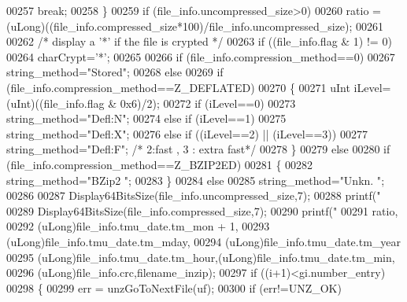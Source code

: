 \begin{DoxyCode}
{{{{{00257             \textcolor{keywordflow}{break};
00258         \}
00259         \textcolor{keywordflow}{if} (file\_info.uncompressed\_size>0)
00260             ratio = (uLong)((file\_info.compressed\_size*100)/file\_info.uncompressed\_size);
00261 
00262         \textcolor{comment}{/* display a '*' if the file is crypted */}
00263         \textcolor{keywordflow}{if} ((file\_info.flag & 1) != 0)
00264             charCrypt=\textcolor{charliteral}{'*'};
00265 
00266         \textcolor{keywordflow}{if} (file\_info.compression\_method==0)
00267             string\_method=\textcolor{stringliteral}{"Stored"};
00268         \textcolor{keywordflow}{else}
00269         \textcolor{keywordflow}{if} (file\_info.compression\_method==Z\_DEFLATED)
00270         \{
00271             uInt iLevel=(uInt)((file\_info.flag & 0x6)/2);
00272             \textcolor{keywordflow}{if} (iLevel==0)
00273               string\_method=\textcolor{stringliteral}{"Defl:N"};
00274             \textcolor{keywordflow}{else} \textcolor{keywordflow}{if} (iLevel==1)
00275               string\_method=\textcolor{stringliteral}{"Defl:X"};
00276             \textcolor{keywordflow}{else} \textcolor{keywordflow}{if} ((iLevel==2) || (iLevel==3))
00277               string\_method=\textcolor{stringliteral}{"Defl:F"}; \textcolor{comment}{/* 2:fast , 3 : extra fast*/}
00278         \}
00279         \textcolor{keywordflow}{else}
00280         \textcolor{keywordflow}{if} (file\_info.compression\_method==Z\_BZIP2ED)
00281         \{
00282               string\_method=\textcolor{stringliteral}{"BZip2 "};
00283         \}
00284         \textcolor{keywordflow}{else}
00285             string\_method=\textcolor{stringliteral}{"Unkn. "};
00286 
00287         Display64BitsSize(file\_info.uncompressed\_size,7);
00288         printf(\textcolor{stringliteral}{"  %
00289         Display64BitsSize(file\_info.compressed\_size,7);
00290         printf(\textcolor{stringliteral}{" %
00291                 ratio,
00292                 (uLong)file\_info.tmu\_date.tm\_mon + 1,
00293                 (uLong)file\_info.tmu\_date.tm\_mday,
00294                 (uLong)file\_info.tmu\_date.tm\_year %
00295                 (uLong)file\_info.tmu\_date.tm\_hour,(uLong)file\_info.tmu\_date.tm\_min,
00296                 (uLong)file\_info.crc,filename\_inzip);
00297         \textcolor{keywordflow}{if} ((i+1)<gi.number\_entry)
00298         \{
00299             err = unzGoToNextFile(uf);
00300             \textcolor{keywordflow}{if} (err!=UNZ\_OK)
}}}}}}}
\end{DoxyCode}
